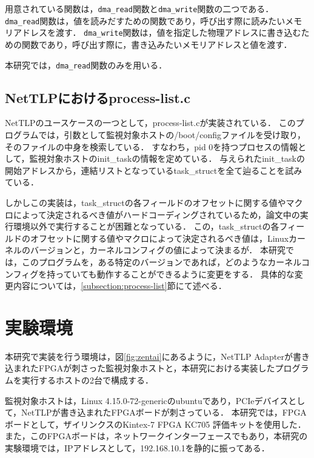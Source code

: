 用意されている関数は，\verb|dma_read|関数と\verb|dma_write|関数の二つである．
\verb|dma_read|関数は，値を読みだすための関数であり，呼び出す際に読みたいメモリアドレスを渡す．
\verb|dma_write|関数は，値を指定した物理アドレスに書き込むための関数であり，呼び出す際に，書き込みたいメモリアドレスと値を渡す．

本研究では，\verb|dma_read|関数のみを用いる．

\subsection{NetTLPにおけるprocess-list.c}
\label{subsection:upa_process-list}

NetTLP\cite{246316}のユースケースの一つとして，process-list.cが実装されている．
このプログラムでは，引数として監視対象ホストの/boot/configファイルを受け取り，そのファイルの中身を検索している．
すなわち，pid 0を持つプロセスの情報として，監視対象ホストのinit\_taskの情報を定めている．
与えられたinit\_taskの開始アドレスから，連結リストとなっているtask\_structを全て辿ることを試みている．

しかしこの実装は，task\_structの各フィールドのオフセットに関する値やマクロによって決定されるべき値がハードコーディングされているため，論文中の実行環境以外で実行することが困難となっている．
この，task\_structの各フィールドのオフセットに関する値やマクロによって決定されるべき値は，Linuxカーネルのバージョンと，カーネルコンフィグの値によって決まるが．
本研究では，このプログラムを，ある特定のバージョンであれば，どのようなカーネルコンフィグを持っていても動作することができるように変更をする．
具体的な変更内容については，\ref{subsection:process-list}節にて述べる．


\section{実験環境}

本研究で実装を行う環境は，図\ref{fig:zentai}にあるように，NetTLP Adapterが書き込まれたFPGAが刺さった監視対象ホストと，本研究における実装したプログラムを実行するホストの2台で構成する．

監視対象ホストは，Linux 4.15.0-72-genericのubuntuであり，PCIeデバイスとして，NetTLPが書き込まれたFPGAボードが刺さっている．
本研究では，FPGAボードとして，ザイリンクスのKintex-7 FPGA KC705 評価キットを使用した．
また，このFPGAボードは，ネットワークインターフェースでもあり，本研究の実験環境では，IPアドレスとして，192.168.10.1を静的に振ってある．

